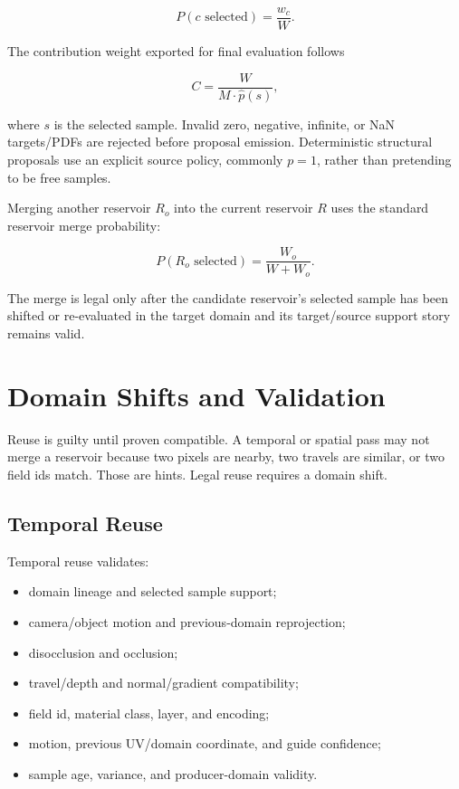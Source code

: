 \documentclass[11pt]{article}
\newcommand{\Target}{\hat{p}}
\newcommand{\Pdf}{p}
\newcommand{\WeightSum}{W}
\begin{document}
\begin{equation}
  P(c \text{ selected}) = \frac{w_c}{\WeightSum}.
\end{equation}

The contribution weight exported for final evaluation follows

\begin{equation}
  C = \frac{\WeightSum}{M \cdot \Target(s)},
\end{equation}

where \(s\) is the selected sample.  Invalid zero, negative, infinite, or NaN
targets/PDFs are rejected before proposal emission.  Deterministic structural
proposals use an explicit source policy, commonly \(\Pdf=1\), rather than
pretending to be free samples.

Merging another reservoir \(R_o\) into the current reservoir \(R\) uses the
standard reservoir merge probability:

\begin{equation}
  P(R_o \text{ selected}) =
  \frac{\WeightSum_o}{\WeightSum + \WeightSum_o}.
\end{equation}

The merge is legal only after the candidate reservoir's selected sample has
been shifted or re-evaluated in the target domain and its target/source support
story remains valid.

\section{Domain Shifts and Validation}

Reuse is guilty until proven compatible.  A temporal or spatial pass may not
merge a reservoir because two pixels are nearby, two travels are similar, or two
field ids match.  Those are hints.  Legal reuse requires a domain shift.

\subsection{Temporal Reuse}

Temporal reuse validates:

\begin{itemize}[leftmargin=1.5em]
  \item domain lineage and selected sample support;
  \item camera/object motion and previous-domain reprojection;
  \item disocclusion and occlusion;
  \item travel/depth and normal/gradient compatibility;
  \item field id, material class, layer, and encoding;
  \item motion, previous UV/domain coordinate, and guide confidence;
  \item sample age, variance, and producer-domain validity.
\end{itemize}
\end{document}
